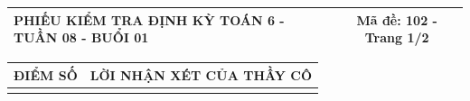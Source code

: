 \documentclass[12pt,a4paper]{article}
\begin{document}
\newpage


\noindent
\begin{tabularx}{\linewidth}{|X|c|}
\hline
\textbf{PHIẾU KIỂM TRA ĐỊNH KỲ TOÁN 6 - TUẦN 08 - BUỔI 01} & \textbf{Mã đề: 102 - Trang 1/2} \\
\hline
\end{tabularx}

\vspace{1mm}

\noindent
\begin{tabularx}{\linewidth}{|p{3.2cm}|X|}
\hline
\centering\textbf{ĐIỂM SỐ} & \centering\textbf{LỜI NHẬN XÉT CỦA THẦY CÔ} \tabularnewline
\hline
\rule{0pt}{1.8cm} & \tabularnewline
\hline
\end{tabularx}

\vspace{1.2mm}
\end{document}
